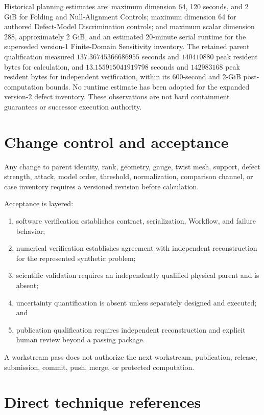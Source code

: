 \documentclass[11pt]{article}
\begin{document}
Historical planning estimates are: maximum dimension 64, 120 seconds, and 2 GiB for
Folding and Null-Alignment Controls; maximum dimension 64 for authored Defect-Model
Discrimination controls; and maximum scalar dimension 288, approximately 2 GiB, and an
estimated 20-minute serial runtime for the superseded version-1 Finite-Domain
Sensitivity inventory.  The retained parent qualification measured
$137.36745366686955$ seconds and $140410880$ peak resident bytes for calculation, and
$13.155915041919798$ seconds and $142983168$ peak resident bytes for independent
verification, within its 600-second and 2-GiB post-computation bounds.  No runtime
estimate has been adopted for the expanded version-2 defect inventory.  These
observations are not hard containment guarantees or successor execution authority.

\section{Change control and acceptance}

Any change to parent identity, rank, geometry, gauge, twist mesh, support, defect
strength, attack, model order, threshold, normalization, comparison channel, or case
inventory requires a versioned revision before calculation.

Acceptance is layered:
\begin{enumerate}[leftmargin=*]
  \item software verification establishes contract, serialization, Workflow, and failure
    behavior;
  \item numerical verification establishes agreement with independent reconstruction
    for the represented synthetic problem;
  \item scientific validation requires an independently qualified physical parent and
    is absent;
  \item uncertainty quantification is absent unless separately designed and executed;
    and
  \item publication qualification requires independent reconstruction and explicit
    human review beyond a passing package.
\end{enumerate}
A workstream pass does not authorize the next workstream, publication, release,
submission, commit, push, merge, or protected computation.

\section{Direct technique references}
\end{document}
